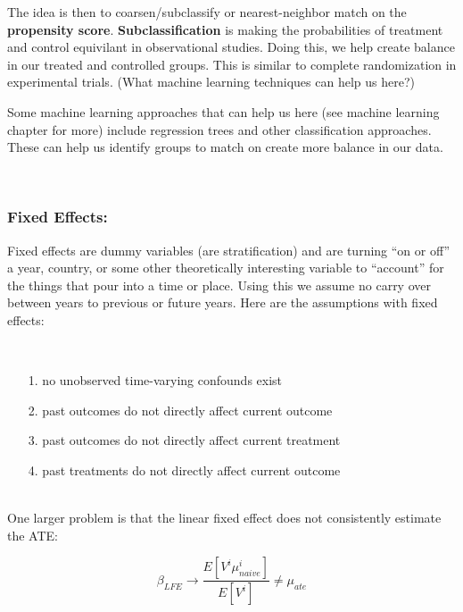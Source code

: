 \documentclass[12pt]{article}\usepackage[]{graphicx}\usepackage[]{color}
\begin{document}
\begin{flushleft}
The idea is then to coarsen/subclassify or nearest-neighbor match on the \textbf{propensity score}.   \textbf{Subclassification} is making the probabilities of treatment and control equivilant in observational studies. Doing this, we help create balance in our treated and controlled groups. This is similar to complete randomization in experimental trials. (What machine learning techniques can help us here?) 

Some machine learning approaches that can help us here (see machine learning chapter for more) include regression trees and other classification approaches. These can help us identify groups to match on create more balance in our data.




\hfill \\

\subsubsection{Fixed Effects:}

Fixed effects are dummy variables (are stratification) and are turning ``on or off'' a year, country, or some other theoretically interesting variable to ``account'' for the things that pour into a time or place. Using this we assume no carry over between years to previous or future years. Here are the assumptions with fixed effects:  

\hfill \\

\begin{itemize}
\item[1.] no unobserved time-varying confounds exist
\item[2.] past outcomes do not directly affect current outcome
\item[3.] past outcomes do not directly affect current treatment
\item[4.] past treatments do not directly affect current outcome
\end{itemize}

\hfill \\

\noindent One larger problem is that the linear fixed effect does not consistently estimate the ATE:

\begin{equation}
\beta_{LFE} \rightarrow \frac{E[V^i \mu^i_{naive}]}{E[V^i]} \neq \mu_{ate}
\end{equation}


\end{flushleft}
\end{document}
